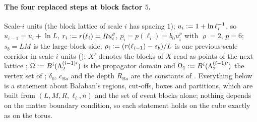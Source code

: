 \paragraph{The four replaced steps at block factor $5$.}
Scale-$i$ units (the block lattice of scale $i$ has spacing $1$); $u_i:=1+\ln\ell_i^{-1}$, so $u_{i-1}=u_i+\ln L$, $r_i:= r(\ell_i)=Ru_i^{\varrho}$, $p_i=p(\ell_i)=b_0u_i^{p}$ with $\varrho=2$, $p=6$; $s_b=LM$ is the large-block side; $\rho_i:=(r(\ell_{i-1})-s_b)/L$ is one previous-scale corridor in scale-$i$ units (\cite[p.~578]{Ba2}); $X'$ denotes the blocks of $X$ read as points of the next lattice \cite[(1.16)]{Ba1}; $\Omega:= B^i(\Lambda_2^{(i-1)\prime})$ is the propagator domain and $\Omega_1:= B^i(\Lambda_7^{(i-1)\prime})$ the vertex set of \cite[(1.1)--(1.5)]{Ba3}; $\delta_0$, $c_{\mathrm{Ba}}$ and the depth $R_{\mathrm{Ba}}$ are the constants of \cite[Props.~2.1--2.3]{Ba1}. Everything below is a statement about Ba{\l}aban's regions, cut-offs, boxes and partitions, which are built from $(L,M,R,\ell_i,\bar n)$ and the set of event blocks alone; nothing depends on the matter boundary condition, so each statement holds on the cube exactly as on the torus.

